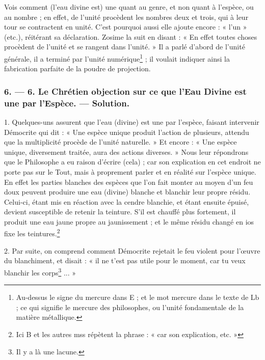 \documentclass[a4paper, 11pt, oneside, polutonikogreek, french]{article}
\begin{document}
Vois comment (l'eau divine est) une quant au genre, et non quant à l'espèce, ou au nombre ; en effet, de l'unité procèdent les nombres deux et trois, qui à leur tour se contractent en unité. C'est pourquoi aussi elle ajoute encore : « l'un » (etc.), réitérant sa déclaration. Zosime la suit en disant : « En effet toutes choses procèdent de l'unité et se rangent dans l'unité. » Il a parlé d'abord de l'unité générale, il a terminé par l'unité numérique\footnote{Au-dessus le signe du mercure dans E ; et le mot mercure dans le texte de Lb ; ce qui signifie le mercure des philosophes, ou l'unité fondamentale de la matière métallique.} ; il voulait indiquer ainsi la fabrication parfaite de la poudre de projection.

\bigskip
\centerline{\EightStarTaper}
\centerline{\EightStarTaper\EightStarTaper}
\bigskip

\subsubsection{6. --- 6. Le Chrétien objection sur ce que l'Eau Divine est une par l'Espèce. --- Solution.}

1. Quelques-uns assurent que l'eau (divine) est une par l'espèce, faisant intervenir Démocrite qui dit : « Une espèce unique produit l'action de plusieurs, attendu que la multiplicité procède de l'unité naturelle. » Et encore : « Une espèce unique, diversement traitée, aura des actions diverses. » Nous leur répondrons que le Philosophe a eu raison d'écrire (cela) ; car son explication en cet endroit ne porte pas sur le Tout, mais à proprement parler et en réalité sur l'espèce unique. En effet les parties blanches des espèces que l'on fait monter au moyen d'un feu doux peuvent produire une eau (divine) blanche et blanchir leur propre résidu. Celui-ci, étant mis en réaction avec la cendre blanchie, et étant ensuite épuisé, devient susceptible de retenir la teinture. S'il est chauffé plus fortement, il produit une eau jaune propre au jaunissement ; et le même résidu changé en ios fixe les teintures.\footnote{Ici B et les autres mss répètent la phrase : « car son explication, etc. »}

2. Par suite, on comprend comment Démocrite rejetait le feu violent pour l'œuvre du blanchiment, et disait : « il ne t'est pas utile pour le moment, car tu veux blanchir les corps\footnote{Il y a là une lacune.} ... »
\end{document}
